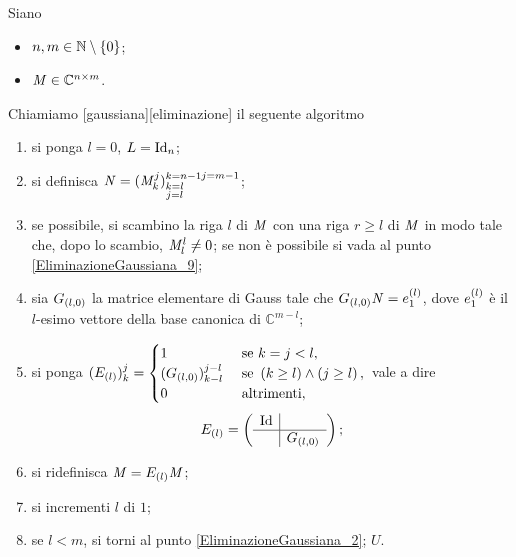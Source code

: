 \begin{Definition}
  \label{def_EliminazioneGaussiana}
  Siano
  \begin{itemize}
    \item $n, m \in \mathbb{N} \setminus \lbrace 0 \rbrace$;
    \item $\mathit{M} \in \mathbb{C}^{n \times m}$.
  \end{itemize}
  Chiamiamo
  [gaussiana][eliminazione]
  il seguente algoritmo
  \begin{enumerate}
    \item\label{EliminazioneGaussiana_1} si ponga $l = 0$, $L = \Identity[n]$;
    \item\label{EliminazioneGaussiana_2} si definisca
      $\mathit{N} = (\mathit{M}_k^j)_{\substack{k = l\\j= l}}^{\substack{k = n - 1}{j = m - 1}}$;
    \item\label{EliminazioneGaussiana_2_1} se possibile, si scambino la riga $l$ di $\mathit{M}$
      con una riga $r \geq l$ di $\mathit{M}$ in modo tale che, dopo lo scambio, $\mathit{M}_l^l \neq 0$;
      se non \`e possibile si vada al punto \ref{EliminazioneGaussiana_9};
    \item\label{EliminazioneGaussiana_3} sia $G_{(l,0)}$ la matrice elementare
      di Gauss tale che
      $G_{(l,0)}\mathit{N} = e_1^{(l)}$, dove
      $e_1^{(l)}$ \`e il $l$-esimo vettore della base
      canonica di $\mathbb{C}^{m - l}$;
    \item\label{EliminazioneGaussiana_4} si ponga
      $(E_{(l)})_k^j =
      \begin{cases}
        1&\text{ se }k = j < l,\\
        (G_{(l,0)})_{k - l}^{j - l}&\text{ se }\left ( k \geq l \right ) \wedge \left ( j \geq l \right ),\\
        0&\text{ altrimenti},
      \end{cases}$
      vale a dire
      \[
        \ElementaryMatrix_{(l)} =
        \lmatrix
        \begin{array}{c|c}
          \Identity &\\
          \hline
          & \GaussElementaryMatrix_{(l,0)}
        \end{array}
        \rmatrix;
      \]
    \item\label{EliminazioneGaussiana_5} si ridefinisca
      $\mathit{M} = E_{(l)}\mathit{M}$;
    \item\label{EliminazioneGaussiana_6} si incrementi
      $l$ di $1$;
    \item\label{EliminazioneGaussiana_7} se $l < m$, si torni al
      punto \ref{EliminazioneGaussiana_2};
      $U$.
  \end{enumerate}
\end{Definition}
